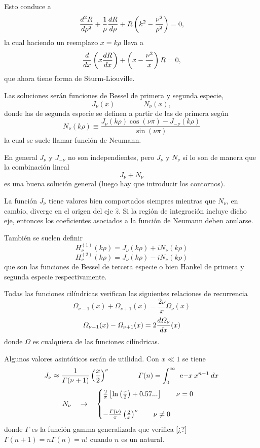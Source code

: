 \documentclass[10pt,oneside]{CBFT_book}
\begin{document}
Esto conduce a 
\[
	\dtot[2]{R}{\rho} + \frac{1}{\rho} \dtot{R}{\rho} +
	R \left( k^2 -  \frac{\nu^2}{\rho^2} \right) = 0,
\]
la cual haciendo un reemplazo $x = k \rho$ lleva a
\[
	\dtot{}{x}\left( x \dtot{R}{x} \right) +
	\left( x -  \frac{\nu^2}{x} \right) R = 0,
\]
que ahora tiene forma de Sturm-Liouville.

Las soluciones serán funciones de Bessel de primera y segunda especie,
\[
	J_\nu (x) \qquad \qquad N_\nu(x), 
\]
donde las de segunda especie se definen a partir de las de primera según
\[
	N_\nu(k\rho) \equiv \frac{ J_\nu(k\rho) \cos(\nu\pi) - J_{-\nu}(k\rho)}{\sin(\nu\pi)}
\]
la cual se suele llamar función de Neumann.

En general $J_{\nu}$ y $J_{-\nu}$ no son independientes, pero $J_{\nu}$ y $N_{\nu}$ sí lo
son de manera que la combinación lineal
\[
	J_{\nu} + N_{\nu}
\]
es una buena solución general (luego hay que introducir los contornos).

La función $J_{\nu}$ tiene valores bien comportados siempres mientras que $N_{\nu}$, en cambio,
diverge en el origen del eje $\hat{z}$. Si la región de integración incluye dicho eje, entonces
los coeficientes asociados a la función de Neumann deben anularse.

También se suelen definir
\[
	H^{(1)}_\nu(k\rho) = J_\nu(k\rho) + i N_\nu(k\rho)
\]
\[
	H^{(2)}_\nu(k\rho) = J_\nu(k\rho) - i N_\nu(k\rho)
\]
que son las funciones de Bessel de tercera especie o bien Hankel de primera y segunda especie respectivamente.

Todas las funciones cilíndricas verifican las siguientes relaciones de recurrencia
\[
	\Omega_{\nu-1}(x) + \Omega_{\nu+1}(x) = \frac{2\nu}{x} \Omega_{\nu}(x)
\]
\[
	\Omega_{\nu-1}(x) - \Omega_{\nu+1}(x) = 2 \dtot{ \Omega_{\nu} }{ x }(x)
\]
donde $\Omega$ es cualquiera de las funciones cilíndricas.

Algunos valores asintóticos serán de utilidad. Con $ x \ll 1$ se tiene
\[
	J_\nu \approx \frac{1}{\Gamma(\nu+1)} \Frac{x}{2}^\nu \qquad \qquad 
	\Gamma(n) = \int_0^\infty \: \euler{-x} \: x^{n-1} \: dx
\]
\[
	N_\nu \quad \to \quad \begin{cases}
			\frac{2}{\pi}\left[ \ln\Frac{x}{2} + 0.57... \right]  \qquad \nu=0 \\
			\\
			- \frac{\Gamma(\nu)}{\pi}\Frac{2}{x}^\nu  \qquad \nu\neq 0
	             \end{cases}
\]
donde $\Gamma$ es la función gamma generalizada que verifica [¿?]
$\Gamma(n+1) = n \Gamma(n) = n!$ cuando $n$ es un natural.
\end{document}
